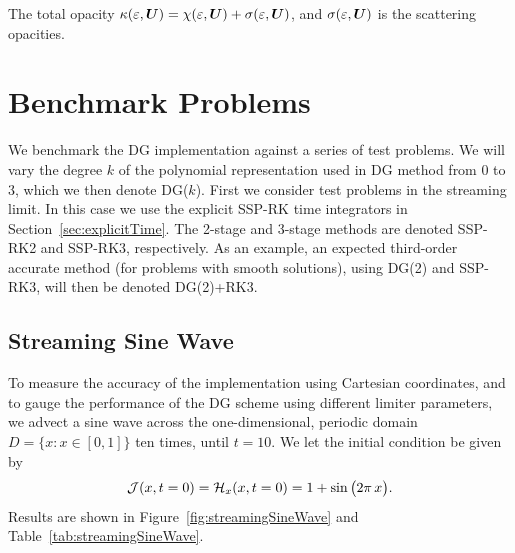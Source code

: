 \documentclass[10pt,preprint]{aastex}
\begin{document}
The total opacity $\kappa(\varepsilon,\boldsymbol{U})=\chi(\varepsilon,\boldsymbol{U})+\sigma(\varepsilon,\boldsymbol{U})$, and $\sigma(\varepsilon,\boldsymbol{U})$ is the scattering opacities.

\clearpage

\section{Benchmark Problems}

We benchmark the DG implementation against a series of test problems.  
We will vary the degree $k$ of the polynomial representation used in DG method from 0 to 3, which we then denote DG($k$).  
First we consider test problems in the streaming limit.  
In this case we use the explicit SSP-RK time integrators in Section~\ref{sec:explicitTime}.  
The 2-stage and 3-stage methods are denoted SSP-RK2 and SSP-RK3, respectively.  
As an example, an expected third-order accurate method (for problems with smooth solutions), using DG(2) and SSP-RK3, will then be denoted DG(2)+RK3.  

\subsection{Streaming Sine Wave}

To measure the accuracy of the implementation using Cartesian coordinates, and to gauge the performance of the DG scheme using different limiter parameters, we advect a sine wave across the one-dimensional, periodic domain $D=\{x:x\in[0,1]\}$ ten times, until $t=10$.  
We let the initial condition be given by
\begin{equation}
  \mathcal{J}(x,t=0)=\mathcal{H}_{x}(x,t=0)=1+\sin\big(2\pi\,x\big).  
\end{equation}
Results are shown in Figure~\ref{fig:streamingSineWave} and Table~\ref{tab:streamingSineWave}.  
\end{document}
